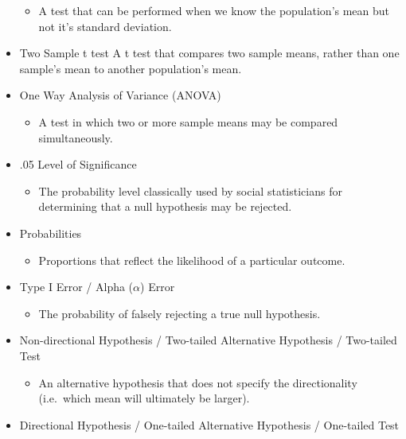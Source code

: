 \documentclass[]{article}
\begin{document}
\begin{itemize}
  \begin{itemize}
  \itemsep1pt\parskip0pt
  \item
    A test that can be performed when we know the population's mean but
    not it's standard deviation.
  \end{itemize}
\item
  Two Sample t test A t test that compares two sample means, rather than
  one sample's mean to another population's mean.
\item
  One Way Analysis of Variance (ANOVA)

  \begin{itemize}
  \itemsep1pt\parskip0pt
  \item
    A test in which two or more sample means may be compared
    simultaneously.
  \end{itemize}
\item
  .05 Level of Significance

  \begin{itemize}
  \itemsep1pt\parskip0pt
  \item
    The probability level classically used by social statisticians for
    determining that a null hypothesis may be rejected.
  \end{itemize}
\item
  Probabilities

  \begin{itemize}
  \itemsep1pt\parskip0pt
  \item
    Proportions that reflect the likelihood of a particular outcome.
  \end{itemize}
\item
  Type I Error / Alpha ($\alpha$) Error

  \begin{itemize}
  \itemsep1pt\parskip0pt
  \item
    The probability of falsely rejecting a true null hypothesis.
  \end{itemize}
\item
  Non-directional Hypothesis / Two-tailed Alternative Hypothesis /
  Two-tailed Test

  \begin{itemize}
  \itemsep1pt\parskip0pt
  \item
    An alternative hypothesis that does not specify the directionality
    (i.e.~which mean will ultimately be larger).
  \end{itemize}
\item
  Directional Hypothesis / One-tailed Alternative Hypothesis /
  One-tailed Test


\end{itemize}
\end{document}
